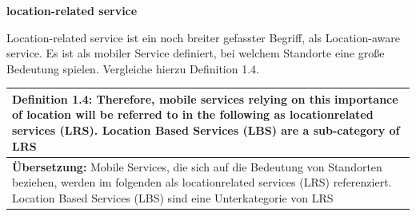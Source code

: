 \newpage
\textbf{location-related service} 

Location-related service ist ein noch breiter gefasster Begriff, als Location-aware service. Es ist als mobiler Service definiert, bei welchem Standorte eine große Bedeutung spielen. Vergleiche hierzu Definition 1.4.

\begin{table}[h]
	\centering
	\begin{tabular}{|p{16cm}|}\hline
		\textbf{Definition 1.4:} \glqq Therefore, mobile services relying on this importance of location will be referred to in the following as locationrelated services (LRS). Location Based Services (LBS) are a sub-category of LRS \grqq \cite[S.5]{strueker2003}\\ \hline
		\textbf{Übersetzung:} Mobile Services, die sich auf die Bedeutung von Standorten beziehen, werden im folgenden als locationrelated services (LRS) referenziert. Location Based Services (LBS) sind eine Unterkategorie von LRS  \\ \hline
	\end{tabular}
\end{table}





